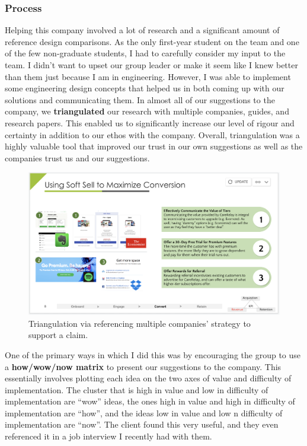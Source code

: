 \documentclass[a4paper,12pt]{article}
\begin{document}
\subsubsection{Process}
Helping this company involved a lot of research and a significant amount of reference design comparisons. As the only first-year student on the team and one of the few non-graduate students, I had to carefully consider my input to the team. I didn’t want to upset our group leader or make it seem like I knew better than them just because I am in engineering. However, I was able to implement some engineering design concepts that helped us in both coming up with our solutions and communicating them.
In almost all of our suggestions to the company, we \textbf{triangulated} our research with multiple companies, guides, and research papers. This enabled us to significantly increase our level of rigour and certainty in addition to our ethos with the company. Overall, triangulation was a highly valuable tool that improved our trust in our own suggestions as well as the companies trust us and our suggestions.

\begin{figure}[H]
\centering
\includegraphics[width=1\textwidth]{img/image010.png}
\caption{Triangulation via referencing multiple companies' strategy to support a claim.}
\label{}
\end{figure}

One of the primary ways in which I did this was by encouraging the group to use a \textbf{how/wow/now matrix} to present our suggestions to the company. This essentially involves plotting each idea on the two axes of value and difficulty of implementation. The cluster that is high in value and low in difficulty of implementation are “wow” ideas, the ones high in value and high in difficulty of implementation are “how”, and the ideas low in value and low n difficulty of implementation are “now”. The client found this very useful, and they even referenced it in a job interview I recently had with them.
\end{document}

